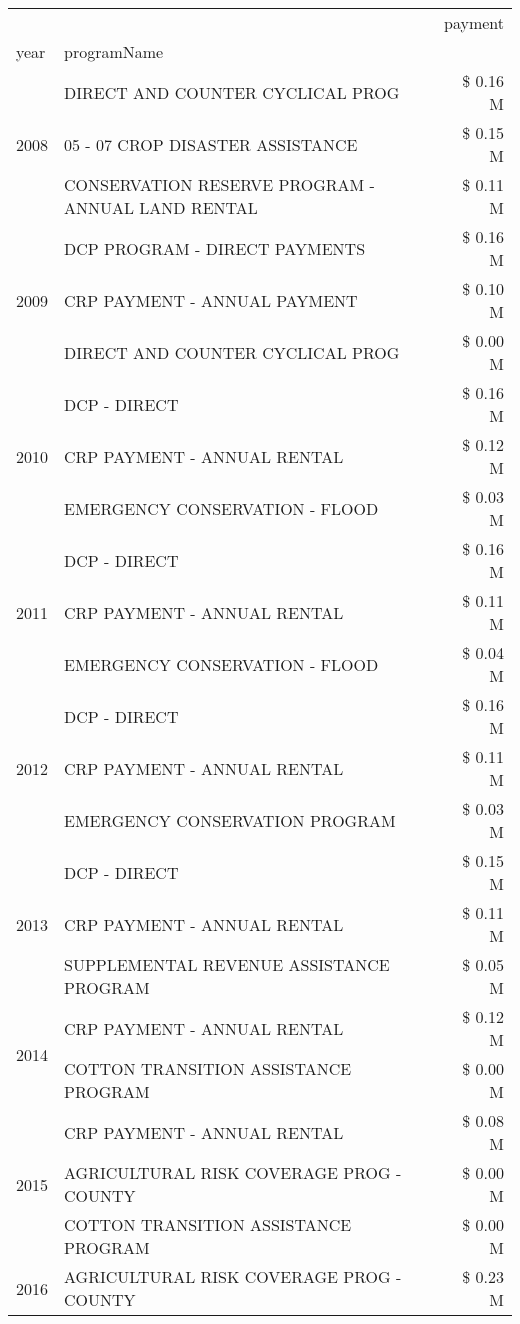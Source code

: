 \begin{tabular}{llr}
\toprule
 &  & payment \\
year & programName &  \\
\midrule
\multirow[t]{3}{*}{2008} & DIRECT AND COUNTER CYCLICAL PROG & \$ 0.16 M \\
 & 05 - 07 CROP DISASTER ASSISTANCE & \$ 0.15 M \\
 & CONSERVATION RESERVE PROGRAM - ANNUAL LAND RENTAL & \$ 0.11 M \\
\cline{1-3}
\multirow[t]{3}{*}{2009} & DCP PROGRAM - DIRECT PAYMENTS & \$ 0.16 M \\
 & CRP PAYMENT - ANNUAL PAYMENT & \$ 0.10 M \\
 & DIRECT AND COUNTER CYCLICAL PROG & \$ 0.00 M \\
\cline{1-3}
\multirow[t]{3}{*}{2010} & DCP - DIRECT & \$ 0.16 M \\
 & CRP PAYMENT - ANNUAL RENTAL & \$ 0.12 M \\
 & EMERGENCY CONSERVATION - FLOOD & \$ 0.03 M \\
\cline{1-3}
\multirow[t]{3}{*}{2011} & DCP - DIRECT & \$ 0.16 M \\
 & CRP PAYMENT - ANNUAL RENTAL & \$ 0.11 M \\
 & EMERGENCY CONSERVATION - FLOOD & \$ 0.04 M \\
\cline{1-3}
\multirow[t]{3}{*}{2012} & DCP - DIRECT & \$ 0.16 M \\
 & CRP PAYMENT - ANNUAL RENTAL & \$ 0.11 M \\
 & EMERGENCY CONSERVATION PROGRAM & \$ 0.03 M \\
\cline{1-3}
\multirow[t]{3}{*}{2013} & DCP - DIRECT & \$ 0.15 M \\
 & CRP PAYMENT - ANNUAL RENTAL & \$ 0.11 M \\
 & SUPPLEMENTAL REVENUE ASSISTANCE PROGRAM & \$ 0.05 M \\
\cline{1-3}
\multirow[t]{2}{*}{2014} & CRP PAYMENT - ANNUAL RENTAL & \$ 0.12 M \\
 & COTTON TRANSITION ASSISTANCE PROGRAM & \$ 0.00 M \\
\cline{1-3}
\multirow[t]{3}{*}{2015} & CRP PAYMENT - ANNUAL RENTAL & \$ 0.08 M \\
 & AGRICULTURAL RISK COVERAGE PROG - COUNTY & \$ 0.00 M \\
 & COTTON TRANSITION ASSISTANCE PROGRAM & \$ 0.00 M \\
\cline{1-3}
\multirow[t]{3}{*}{2016} & AGRICULTURAL RISK COVERAGE PROG - COUNTY & \$ 0.23 M \\

\end{tabular}
